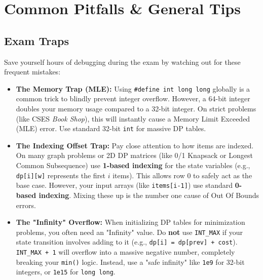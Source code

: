 \section{Common Pitfalls \& General Tips}
\subsection{Exam Traps}

Save yourself hours of debugging during the exam by watching out for these frequent mistakes:

\begin{itemize}
    \item \textbf{The Memory Trap (MLE):} Using \texttt{\#define int long long} globally is a common trick to blindly prevent integer overflow. However, a 64-bit integer doubles your memory usage compared to a 32-bit integer. On strict problems (like CSES \textit{Book Shop}), this will instantly cause a Memory Limit Exceeded (MLE) error. Use standard 32-bit \texttt{int} for massive DP tables.
    
    \item \textbf{The Indexing Offset Trap:} Pay close attention to how items are indexed. On many graph problems or 2D DP matrices (like 0/1 Knapsack or Longest Common Subsequence) use \textbf{1-based indexing} for the state variables (e.g., \texttt{dp[i][w]} represents the first $i$ items). This allows row $0$ to safely act as the base case. However, your input arrays (like \texttt{items[i-1]}) use standard \textbf{0-based indexing}. Mixing these up is the number one cause of Out Of Bounds errors.
    
    \item \textbf{The "Infinity" Overflow:} When initializing DP tables for minimization problems, you often need an "Infinity" value. Do \textbf{not} use \texttt{INT\_MAX} if your state transition involves adding to it (e.g., \texttt{dp[i] = dp[prev] + cost}). \texttt{INT\_MAX + 1} will overflow into a massive negative number, completely breaking your \texttt{min()} logic. Instead, use a "safe infinity" like \texttt{1e9} for 32-bit integers, or \texttt{1e15} for \texttt{long long}.
\end{itemize}